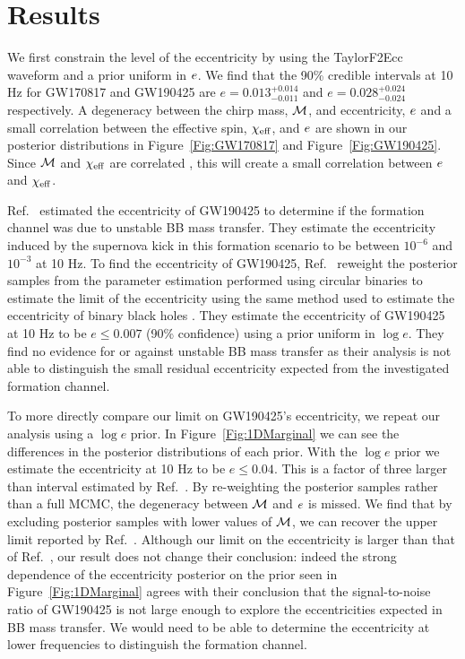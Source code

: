 \section{Results}
\label{sec:pe-Results}
We first constrain the level of the eccentricity by using the TaylorF2Ecc waveform and a prior uniform in $e$. We find that the 90\% credible intervals at 10 Hz for GW170817 and GW190425 are $e = 0.013^{+0.014}_{-0.011}$ and $e = 0.028^{+0.024}_{-0.024}$ respectively. A degeneracy between the chirp mass, $\mathcal{M}$, and eccentricity, $e$ and a small correlation between the effective spin, $\chi_{\mathrm{eff}}$, and $e$ are shown in our posterior distributions in Figure~\ref{Fig:GW170817} and Figure~\ref{Fig:GW190425}. Since $\mathcal{M}$ and $\chi_{\mathrm{eff}}$ are correlated \cite{Baird:2012cu,Safarzadeh:2020mlb}, this will create a small correlation between $e$ and $\chi_{\mathrm{eff}}$.

Ref.~\cite{Romero-Shaw:2020aaj} estimated the eccentricity of GW190425 to determine if the formation channel was due to unstable BB mass transfer. They estimate the eccentricity induced by the supernova kick in this formation scenario to be between $10^{-6}$ and $10^{-3}$ at 10 Hz. To find the eccentricity of GW190425, Ref.~\cite{Romero-Shaw:2020aaj} reweight the posterior samples from the parameter estimation performed using circular binaries to estimate the limit of the eccentricity using the same method used to estimate the eccentricity of binary black holes \cite{Romero-Shaw:2019itr}. They estimate the eccentricity of GW190425 at 10 Hz to be $e \leq 0.007$ (90\% confidence) using a prior uniform in $\log e$. They find no evidence for or against unstable BB mass transfer as their analysis is not able to distinguish the small residual eccentricity expected from the investigated formation channel. 

To more directly compare our limit on GW190425's eccentricity, we repeat our analysis using a $\log e$ prior. In Figure~\ref{Fig:1DMarginal} we can see the differences in the posterior distributions of each prior. With the $\log e$ prior we estimate the eccentricity at 10 Hz to be $e \leq 0.04$. This is a factor of three larger than interval estimated by Ref.~\cite{Romero-Shaw:2020aaj}. By re-weighting the posterior samples rather than a full MCMC, the degeneracy between $\mathcal{M}$ and $e$ is missed. We find that by excluding posterior samples with lower values of $\mathcal{M}$, we can recover the upper limit reported by Ref.~\cite{Romero-Shaw:2020aaj}. Although our limit on the eccentricity is larger than that of Ref.~\cite{Romero-Shaw:2020aaj}, our result does not change their conclusion: indeed the strong dependence of the eccentricity posterior on the prior seen in Figure~\ref{Fig:1DMarginal} agrees with their conclusion that the signal-to-noise ratio of GW190425 is not large enough to explore the eccentricities expected in BB mass transfer. We would need to be able to determine the eccentricity at lower frequencies to distinguish the formation channel.

